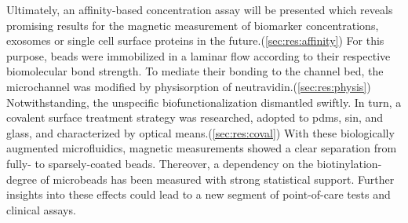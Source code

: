 Ultimately, an affinity-based concentration assay will be presented which reveals promising results for the magnetic measurement of biomarker concentrations, exosomes or single cell surface proteins in the future.(\cref{sec:res:affinity}) For this purpose, beads were immobilized in a laminar flow according to their respective biomolecular bond strength. To mediate their bonding to the channel bed, the microchannel was modified by physisorption of neutravidin.(\cref{sec:res:physis}) Notwithstanding, the unspecific biofunctionalization dismantled swiftly. In turn, a covalent surface treatment strategy was researched, adopted to \acrshort{pdms}, \acrshort{sin}, and glass, and characterized by optical means.(\cref{sec:res:coval}) With these biologically augmented microfluidics, magnetic measurements showed a clear separation from fully- to sparsely-coated beads. Thereover, a dependency on the biotinylation-degree of microbeads has been measured with strong statistical support. Further insights into these effects could lead to a new segment of point-of-care tests and clinical assays.



